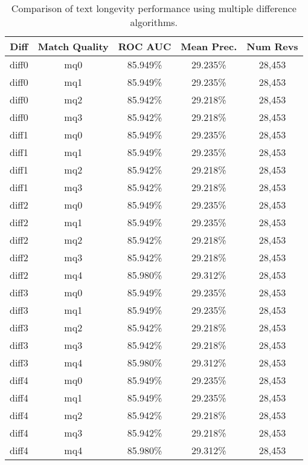 \begin{table}[tbph]
\begin{center}
\begin{tabular}{|c|c||c|c|c|}
\hline
Diff & Match Quality & ROC AUC & Mean Prec. & Num Revs \\
\hline
\hline
diff0 & mq0 & 85.949\% & 29.235\% & 28,453 \\
diff0 & mq1 & 85.949\% & 29.235\% & 28,453 \\
diff0 & mq2 & 85.942\% & 29.218\% & 28,453 \\
diff0 & mq3 & 85.942\% & 29.218\% & 28,453 \\
diff1 & mq0 & 85.949\% & 29.235\% & 28,453 \\
diff1 & mq1 & 85.949\% & 29.235\% & 28,453 \\
diff1 & mq2 & 85.942\% & 29.218\% & 28,453 \\
diff1 & mq3 & 85.942\% & 29.218\% & 28,453 \\
diff2 & mq0 & 85.949\% & 29.235\% & 28,453 \\
diff2 & mq1 & 85.949\% & 29.235\% & 28,453 \\
diff2 & mq2 & 85.942\% & 29.218\% & 28,453 \\
diff2 & mq3 & 85.942\% & 29.218\% & 28,453 \\
diff2 & mq4 & 85.980\% & 29.312\% & 28,453 \\
diff3 & mq0 & 85.949\% & 29.235\% & 28,453 \\
diff3 & mq1 & 85.949\% & 29.235\% & 28,453 \\
diff3 & mq2 & 85.942\% & 29.218\% & 28,453 \\
diff3 & mq3 & 85.942\% & 29.218\% & 28,453 \\
diff3 & mq4 & 85.980\% & 29.312\% & 28,453 \\
diff4 & mq0 & 85.949\% & 29.235\% & 28,453 \\
diff4 & mq1 & 85.949\% & 29.235\% & 28,453 \\
diff4 & mq2 & 85.942\% & 29.218\% & 28,453 \\
diff4 & mq3 & 85.942\% & 29.218\% & 28,453 \\
diff4 & mq4 & 85.980\% & 29.312\% & 28,453 \\
\hline
\end{tabular}
\end{center}
\caption{Comparison of text longevity performance using
    multiple difference algorithms.}
\label{tab:textlongeval}
\end{table}

